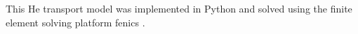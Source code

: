 

This \gls{He} transport model was implemented in Python and solved using the finite element solving platform \gls{fenics} .
